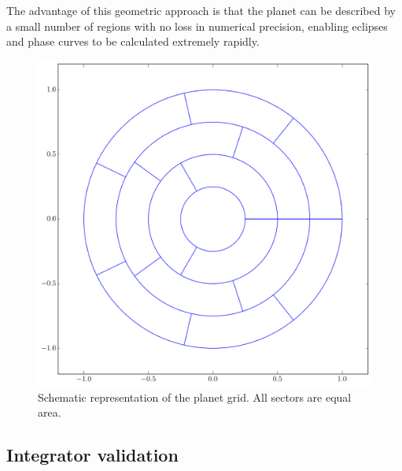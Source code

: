 \documentclass[a4paper,fleqn,usenatbib]{mnras}
\begin{document}
The advantage of this geometric approach is that the planet can be described by a small number of regions with no loss in numerical precision, enabling eclipses and phase curves to be calculated extremely rapidly.

\begin{figure}
\begin{center}
\includegraphics[width=0.8\columnwidth]{img/frame1.pdf}
\caption{Schematic representation of the planet grid. All sectors are equal area.}
\label{fig:schematic}
\end{center}
\end{figure}

\subsection{Integrator validation}\label{sec:numerical}
\end{document}
